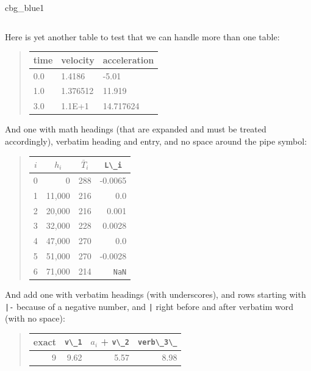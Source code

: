\documentclass[%
oneside,                 %
final,                   %
10pt]{article}
\newenvironment{_cod_tight}[1]{
   \def\FrameCommand{\colorbox{#1}}
   \FrameRule0.6pt\MakeFramed {\FrameRestore}\vskip3mm}
   {\vskip0mm\endMakeFramed}
\newenvironment{cod}[1]{
\bgroup\rmfamily
\fboxsep=0mm\relax
\begin{_cod_tight}{#1}
\list{}{\parsep=-2mm\parskip=0mm\topsep=0pt\leftmargin=2mm
\rightmargin=2\leftmargin\leftmargin=4pt\relax}
\item\relax}
{\endlist\end{_cod_tight}\egroup}
\theoremstyle{definition}
\begin{document}
\begin{enumerate}
\begin{cod}{cbg_blue1}
\begin{lstlisting}[language=Python,style=myspeciallststyle,numbers=left,numberstyle=\tiny,stepnumber=3,numbersep=15pt,xleftmargin=1mm]
\end{lstlisting}\end{cod}
\noindent

Here is yet another table to test that we can handle more than
one table:
\begin{quote}
\begin{tabular}{lll}
\hline
\multicolumn{1}{l}{ time } & \multicolumn{1}{l}{ velocity } & \multicolumn{1}{l}{ acceleration } \\
\hline
0.0  & 1.4186   & -5.01        \\
1.0  & 1.376512 & 11.919       \\
3.0  & 1.1E+1   & 14.717624    \\
\hline
\end{tabular}
\end{quote}
\noindent
And one with math headings (that are expanded and must be treated
accordingly), verbatim heading and entry, and no space around the pipe
symbol:
\begin{quote}
\begin{tabular}{lrrr}
\hline
\multicolumn{1}{c}{ $i$ } & \multicolumn{1}{c}{ $h_i$ } & \multicolumn{1}{c}{ $\bar T_i$ } & \multicolumn{1}{c}{ \Verb!L\_i! } \\
\hline
0   & 0      & 288        & -0.0065    \\
1   & 11,000 & 216        & 0.0        \\
2   & 20,000 & 216        & 0.001      \\
3   & 32,000 & 228        & 0.0028     \\
4   & 47,000 & 270        & 0.0        \\
5   & 51,000 & 270        & -0.0028    \\
6   & 71,000 & 214        & \texttt{NaN} \\
\hline
\end{tabular}
\end{quote}
\noindent
And add one with verbatim headings (with underscores),
and rows starting with \texttt{|-} because of a negative number,
and \texttt{|} right before and after verbatim word (with no space):
\begin{quote}
\begin{tabular}{rrrr}
\hline
\multicolumn{1}{c}{ exact } & \multicolumn{1}{c}{ \Verb!v\_1! } & \multicolumn{1}{c}{ $a_i$ + \Verb!v\_2! } & \multicolumn{1}{c}{ \Verb!verb\_3\_! } \\
\hline
9     & 9.62       & 5.57               & 8.98           \\

\end{tabular}
\end{quote}
\end{enumerate}
\end{document}
